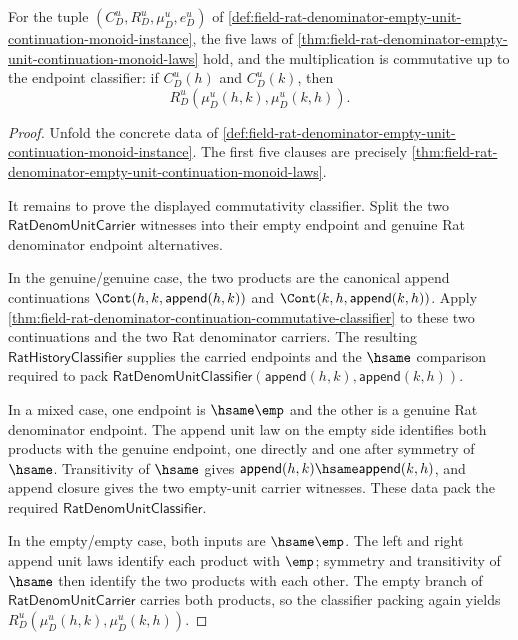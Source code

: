 \begin{theorem}
\label{thm:field-rat-denominator-empty-unit-commutative-monoid-laws}
For the tuple $(C_D^u,R_D^u,\mu_D^u,e_D^u)$ of
\autoref{def:field-rat-denominator-empty-unit-continuation-monoid-instance},
the five laws of
\autoref{thm:field-rat-denominator-empty-unit-continuation-monoid-laws} hold,
and the multiplication is commutative up to the endpoint classifier: if
$C_D^u(h)$ and $C_D^u(k)$, then
$$
R_D^u(\mu_D^u(h,k),\mu_D^u(k,h)).
$$
\end{theorem}
\begin{proof}
Unfold the concrete data of
\autoref{def:field-rat-denominator-empty-unit-continuation-monoid-instance}.
The first five clauses are precisely
\autoref{thm:field-rat-denominator-empty-unit-continuation-monoid-laws}.

It remains to prove the displayed commutativity classifier. Split the two
$\mathsf{RatDenomUnitCarrier}$ witnesses into their empty endpoint and genuine
Rat denominator endpoint alternatives.

In the genuine/genuine case, the two products are the canonical append
continuations $\Cont(h,k,\mathsf{append}(h,k))$ and
$\Cont(k,h,\mathsf{append}(k,h))$. Apply
\autoref{thm:field-rat-denominator-continuation-commutative-classifier} to
these two continuations and the two Rat denominator carriers. The resulting
$\mathsf{RatHistoryClassifier}$ supplies the carried endpoints and the
$\hsame$ comparison required to pack
$\mathsf{RatDenomUnitClassifier}(\mathsf{append}(h,k),\mathsf{append}(k,h))$.

In a mixed case, one endpoint is $\hsame\emp$ and the other is a genuine Rat
denominator endpoint. The append unit law on the empty side identifies both
products with the genuine endpoint, one directly and one after symmetry of
$\hsame$. Transitivity of $\hsame$ gives
$\mathsf{append}(h,k)\hsame\mathsf{append}(k,h)$, and append closure gives the
two empty-unit carrier witnesses. These data pack the required
$\mathsf{RatDenomUnitClassifier}$.

In the empty/empty case, both inputs are $\hsame\emp$. The left and right
append unit laws identify each product with $\emp$; symmetry and transitivity
of $\hsame$ then identify the two products with each other. The empty branch
of $\mathsf{RatDenomUnitCarrier}$ carries both products, so the classifier
packing again yields
$R_D^u(\mu_D^u(h,k),\mu_D^u(k,h))$.
\end{proof}

